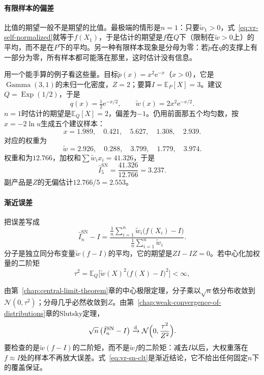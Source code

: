 \paragraph{有限样本的偏差}
比值的期望一般不是期望的比值。最极端的情形是$n=1$：只要$\widetilde{w}_1>0$，式~\eqref{eq:vr-self-normalized}就等于$f(X_1)$，于是估计的期望是$f$在$Q$下（限制在$\widetilde{w}>0$上）的平均，而不是在$P$下的平均。另一种有限样本现象是分母为零：若$\widetilde{p}$在$q$的支撑上有一部分为零，所有样本都可能落在那里，这时估计没有信息。

用一个能手算的例子看这些量。目标$\widetilde{p}(x)=x^2\mathrm{e}^{-x}$（$x>0$），它是$\operatorname{Gamma}(3,1)$的未归一化密度，$Z=2$；要算$I=\mathbb{E}_P[X]=3$。建议$Q=\operatorname{Exp}(1/2)$，于是
\[
 q(x)=\tfrac12\mathrm{e}^{-x/2},\qquad \widetilde{w}(x)=2x^2\mathrm{e}^{-x/2} .
\]
$n=1$时估计的期望是$\mathbb{E}_Q[X]=2$，偏差为$-1$。仍用前面那五个均匀数，按$x=-2\ln u$生成五个建议样本：
\[
 x=1.989,\quad 0.421,\quad 5.627,\quad 1.308,\quad 2.939 .
\]
对应的权重为
\[
 \widetilde{w}=2.926,\quad 0.288,\quad 3.799,\quad 1.779,\quad 3.974 .
\]
权重和为$12.766$，加权和$\sum\widetilde{w}_ix_i=41.326$，于是
\[
 \hat{I}_5^{\mathrm{SN}}=\frac{41.326}{12.766}=3.237 .
\]
副产品是$Z$的无偏估计$12.766/5=2.553$。

\paragraph{渐近误差}
把误差写成
\[
 \hat{I}_n^{\mathrm{SN}}-I=\frac{\frac1n\sum_{i=1}^{n}\widetilde{w}_i\bigl(f(X_i)-I\bigr)}{\frac1n\sum_{i=1}^{n}\widetilde{w}_i} .
\]
分子是独立同分布变量$\widetilde{w}(f-I)$的平均，它的期望是$ZI-IZ=0$。若中心化加权量的二阶矩
\begin{equation}
 \tau^2=\mathbb{E}_Q\bigl[\widetilde{w}(X)^2\bigl(f(X)-I\bigr)^2\bigr]<\infty ,
 \label{eq:vr-sn-tau}
\end{equation}

由第~\ref{chap:central-limit-theorem}章的中心极限定理，分子乘以$\sqrt{n}$依分布收敛到$\mathcal{N}(0,\tau^2)$；分母几乎必然收敛到$Z$。由第~\ref{chap:weak-convergence-of-distributions}章的Slutsky定理，
\begin{equation}
 \sqrt{n}\,\bigl(\hat{I}_n^{\mathrm{SN}}-I\bigr)\xrightarrow{\mathrm{d}}\mathcal{N}\Bigl(0,\frac{\tau^2}{Z^2}\Bigr) .
 \label{eq:vr-sn-clt}
\end{equation}
要检查的是$\widetilde{w}(f-I)$的二阶矩，而不是$\widetilde{w}f$的二阶矩：减去$I$以后，大权重落在$f\approx I$处的样本不再放大误差。式~\eqref{eq:vr-sn-clt}是渐近结论，它不给出任何固定$n$下的覆盖保证。

